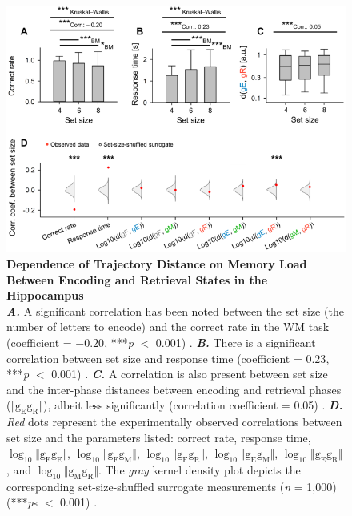 \documentclass[final,3p,times,twocolumn]{elsarticle}
\begin{document}
        \begin{figure}[ht]
        	\centering
            \includegraphics[width=1\textwidth]{./src/figures/.png/Figure_ID_03.png}
        	\caption{\textbf{
Dependence of Trajectory Distance on Memory Load Between Encoding and Retrieval States in the Hippocampus
}
\smallskip
\\
\textbf{\textit{A.}} A significant correlation has been noted between the set size (the number of letters to encode) and the correct rate in the WM task (coefficient = $-0.20$, ***\textit{p} $<$ 0.001) \cite{van_vugt_hippocampal_2010, li_functional_2023, borders_hippocampus_2022}. \textbf{\textit{B.}} There is a significant correlation between set size and response time (coefficient = $0.23$, ***\textit{p} $<$ 0.001) \cite{dimakopoulos_information_2022}.  \textbf{\textit{C.}} A correlation is also present between set size and the inter-phase distances between encoding and retrieval phases ($\Vert \mathrm{g_{E}g_{R}} \Vert$), albeit less significantly (correlation coefficient = 0.05) \cite{li_functional_2023}. \textbf{\textit{D.}} \textit{Red} dots represent the experimentally observed correlations between set size and the parameters listed: correct rate, response time, $\log_{10}{\Vert \mathrm{g_{F}g_{E}} \Vert}$, $\log_{10}{\Vert \mathrm{g_{F}g_{M}} \Vert}$, $\log_{10}{\Vert \mathrm{g_{F}g_{R}} \Vert}$, $\log_{10}{\Vert \mathrm{g_{E}g_{M}} \Vert}$, $\log_{10}{\Vert \mathrm{g_{E}g_{R}} \Vert}$, and $\log_{10}{\Vert \mathrm{g_{M}g_{R}} \Vert}$. The \textit{gray} kernel density plot depicts the corresponding set-size-shuffled surrogate measurements (\textit{n} = 1,000) (***\textit{p}s $<$ 0.001) \cite{norimoto_hippocampal_2018, hajos_input-output_2013}.
}
        	\label{fig:03}
        \end{figure}
\end{document}
